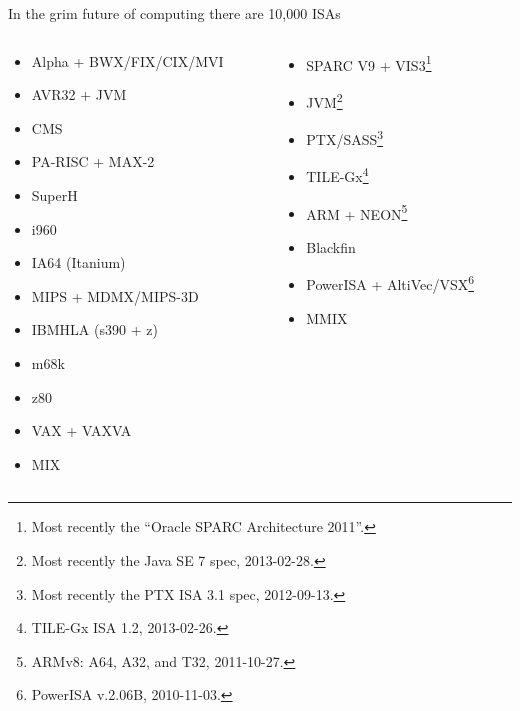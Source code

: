\documentclass[mathserif,xcolor={dvipsnames,table}]{beamer}
\begin{document}
\begin{frame}{In the grim future of computing there are 10,000 ISAs}
\begin{columns}
\begin{column}{.5\textwidth}
\footnotesize{
\begin{itemize}
\item Alpha + BWX/FIX/CIX/MVI
\item AVR32 + JVM
\item CMS
\item PA-RISC + MAX-2
\item SuperH 
\item i960
\item IA64 (Itanium)
\item MIPS + MDMX/MIPS-3D
\item IBMHLA (s390 + z)
\item m68k
\item z80
\item VAX + VAXVA
\item MIX
\end{itemize}
}
\end{column}
\begin{column}{.5\textwidth}
\footnotesize{
\begin{itemize}
\item SPARC V9 + VIS3\footnote{\tiny{Most recently the ``Oracle SPARC Architecture 2011''.}}
\item JVM\footnote{\tiny{Most recently the Java SE 7 spec, 2013-02-28.}}
\item PTX/SASS\footnote{\tiny{Most recently the PTX ISA 3.1 spec, 2012-09-13.}}
\item TILE-Gx\footnote{\tiny{TILE-Gx ISA 1.2, 2013-02-26.}}
\item ARM + NEON\footnote{\tiny{ARMv8: A64, A32, and T32, 2011-10-27.}}
\item Blackfin
\item PowerISA + AltiVec/VSX\footnote{\tiny{PowerISA v.2.06B, 2010-11-03.}}
\item MMIX
\end{itemize}
}
\end{column}
\end{columns}
\end{frame}
\end{document}
